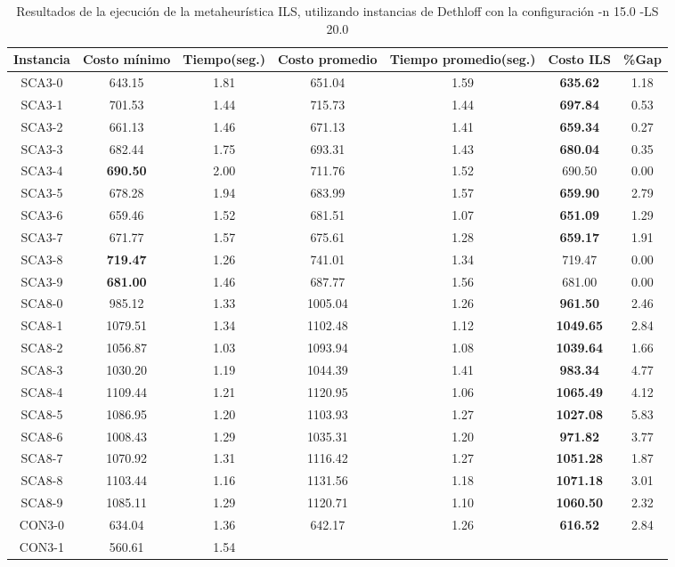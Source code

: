 \begin{table}[ht]
\caption{Resultados de la ejecución de la metaheurística ILS, utilizando instancias de Dethloff con la configuración -n 15.0 -LS 20.0}
\centering
\small
\begin{tabular}{c c c c c c c}
\hline\hline
Instancia & Costo mínimo & Tiempo(seg.) & Costo promedio & Tiempo promedio(seg.) & Costo ILS & \%Gap \\ [0.5ex]
\hline
SCA3-0 & 643.15 & 1.81 & 
651.04 & 1.59 & \bf{635.62} & 
1.18\\SCA3-1 & 701.53 & 1.44 & 
715.73 & 1.44 & \bf{697.84} & 
0.53\\SCA3-2 & 661.13 & 1.46 & 
671.13 & 1.41 & \bf{659.34} & 
0.27\\SCA3-3 & 682.44 & 1.75 & 
693.31 & 1.43 & \bf{680.04} & 
0.35\\SCA3-4 & \bf{690.50} & 2.00 & 
711.76 & 1.52 & 690.50 & 0.00\\
SCA3-5 & 678.28 & 1.94 & 
683.99 & 1.57 & \bf{659.90} & 
2.79\\SCA3-6 & 659.46 & 1.52 & 
681.51 & 1.07 & \bf{651.09} & 
1.29\\SCA3-7 & 671.77 & 1.57 & 
675.61 & 1.28 & \bf{659.17} & 
1.91\\SCA3-8 & \bf{719.47} & 1.26 & 
741.01 & 1.34 & 719.47 & 0.00\\
SCA3-9 & \bf{681.00} & 1.46 & 
687.77 & 1.56 & 681.00 & 0.00\\
SCA8-0 & 985.12 & 1.33 & 
1005.04 & 1.26 & \bf{961.50} & 
2.46\\SCA8-1 & 1079.51 & 1.34 & 
1102.48 & 1.12 & \bf{1049.65} & 
2.84\\SCA8-2 & 1056.87 & 1.03 & 
1093.94 & 1.08 & \bf{1039.64} & 
1.66\\SCA8-3 & 1030.20 & 1.19 & 
1044.39 & 1.41 & \bf{983.34} & 
4.77\\SCA8-4 & 1109.44 & 1.21 & 
1120.95 & 1.06 & \bf{1065.49} & 
4.12\\SCA8-5 & 1086.95 & 1.20 & 
1103.93 & 1.27 & \bf{1027.08} & 
5.83\\SCA8-6 & 1008.43 & 1.29 & 
1035.31 & 1.20 & \bf{971.82} & 
3.77\\SCA8-7 & 1070.92 & 1.31 & 
1116.42 & 1.27 & \bf{1051.28} & 
1.87\\SCA8-8 & 1103.44 & 1.16 & 
1131.56 & 1.18 & \bf{1071.18} & 
3.01\\SCA8-9 & 1085.11 & 1.29 & 
1120.71 & 1.10 & \bf{1060.50} & 
2.32\\CON3-0 & 634.04 & 1.36 & 
642.17 & 1.26 & \bf{616.52} & 
2.84\\CON3-1 & 560.61 & 1.54 & 

\end{tabular}
\end{table}

